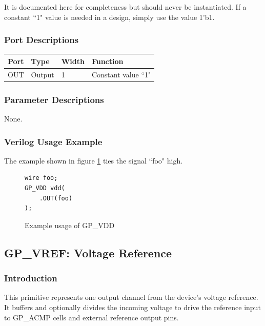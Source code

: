 \documentclass{article}
\begin{document}
It is documented here for completeness but should never be instantiated. If a constant ``1" value is needed in a 
design, simply use the value 1'b1.

\subsubsection{Port Descriptions}

\begin{tabularx}{4in}{|l|l|l|X|}
\hline
{\bfseries Port} & {\bfseries Type} & {\bfseries Width} & {\bfseries Function} \\
\hline
OUT & Output & 1 & Constant value ``1" \\
\hline
\end{tabularx}

\subsubsection{Parameter Descriptions}

None.

\subsubsection{Verilog Usage Example}

The example shown in figure \ref{gp-vdd-example} ties the signal ``foo" high.

\begin{figure}[h]
\begin{lstlisting}
wire foo;
GP_VDD vdd(
	.OUT(foo)
);
\end{lstlisting}
\caption{Example usage of GP\_VDD}
\label{gp-vdd-example}
\end{figure}


\pagebreak
\subsection{GP\_VREF: Voltage Reference}

\subsubsection{Introduction}
This primitive represents one output channel from the device's voltage reference. It buffers and optionally divides the 
incoming voltage to drive the reference input to GP\_ACMP cells and external reference output pins.
\end{document}
